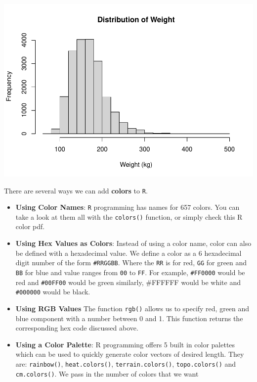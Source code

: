 \documentclass[
]{book}
\begin{document}
\includegraphics{_main_files/figure-latex/unnamed-chunk-172-1.pdf}

There are several ways we can add \textbf{colors} to \texttt{R}.

\begin{itemize}
\item
  \textbf{Using Color Names}: \texttt{R} programming has names for 657 colors. You can take a look at them all with the \texttt{colors()} function, or simply check this R color pdf.
\item
  \textbf{Using Hex Values as Colors}: Instead of using a color name, color can also be defined with a hexadecimal value. We define a color as a 6 hexadecimal digit number of the form \texttt{\#RRGGBB}. Where the \texttt{RR} is for red, \texttt{GG} for green and \texttt{BB} for blue and value ranges from \texttt{00} to \texttt{FF}. For example, \texttt{\#FF0000} would be red and \texttt{\#00FF00} would be green similarly, \#FFFFFF would be white and \texttt{\#000000} would be black.
\item
  \textbf{Using RGB Values} The function \texttt{rgb()} allows us to specify red, green and blue component with a number between 0 and 1. This function returns the corresponding hex code discussed above.
\item
  \textbf{Using a Color Palette}: R programming offers 5 built in color palettes which can be used to quickly generate color vectors of desired length. They are: \texttt{rainbow()}, \texttt{heat.colors()}, \texttt{terrain.colors()}, \texttt{topo.colors()} and \texttt{cm.colors()}. We pass in the number of colors that we want
\end{itemize}
\end{document}
